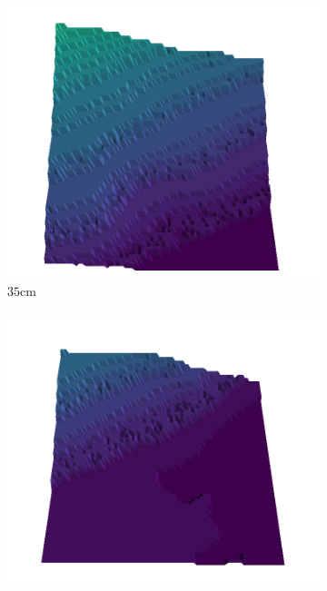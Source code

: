 \documentclass[../document.tex]{subfiles}
\begin{document}
\begin{figure}[H]
    \centering
    \begin{subfigure}[b]{0.19\textwidth}
    \includegraphics[width=\linewidth]{../img/5/quarry/all/best/35-patch-3d-majavi-colormap-0.png}
    \caption{$35$cm}
    \end{subfigure}
    \begin{subfigure}[b]{0.19\textwidth}
    \includegraphics[width=\linewidth]{../img/5/quarry/all/best/38-patch-3d-majavi-colormap-1.png}

\end{subfigure}
\end{figure}
\end{document}

